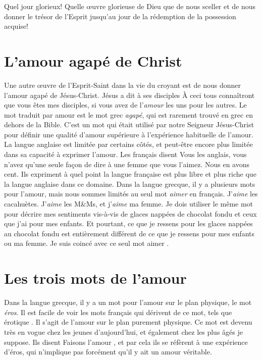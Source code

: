 Quel jour glorieux! Quelle œuvre glorieuse de Dieu que de nous sceller
 et de nous donner le trésor de l'Esprit jusqu'au jour de la rédemption
 de la possession acquise!


\section{L'amour agap\'e de Christ}

Une autre œuvre de l'Esprit-Saint dans la vie du croyant
 est de nous donner l'amour agapé de Jésus-Christ.
 Jésus a dit à ses disciples\frcolon{}
 \Og À ceci tous connaîtront que vous êtes mes disciples,
 si vous avez de l'\emph{amour} les uns pour les autres. \Fg{}
 Le mot traduit par \Og amour \Fg{} est le mot grec \emph{agapé},
 qui est rarement trouvé en grec en dehors de la Bible.
 C'est un mot qui était utilisé par notre Seigneur Jésus-Christ
 pour définir une qualité d'amour supérieure à l'expérience habituelle
 de l'amour.
 La langue anglaise est limitée par certains côtés,
 et peut-être encore plus limitée dans sa capacité à exprimer l'amour.
 Les français disent\frcolon{}
 \Og Vous les anglais, vous n'avez qu'une seule façon de dire à une femme
 que vous l'aimez. Nous en avons cent. \Fg{}
 Ils expriment à quel point la langue française est plus libre et plus riche
 que la langue anglaise dans ce domaine.
 Dans la langue grecque, il y a plusieurs mots pour l'amour,
 mais nous sommes limités au seul mot \emph{aimer} en français.
 J'\emph{aime} les cacahuètes. J'\emph{aime} les M\&Ms,
 et j'\emph{aime} ma femme.
 Je dois utiliser le même mot pour décrire mes sentiments
 vis-à-vis de glaces nappées de chocolat fondu et ceux que j'ai
 pour mes enfants. Et pourtant, ce que je ressens pour les glaces nappées
 au chocolat fondu est entièrement différent de ce que je ressens
 pour mes enfants ou ma femme.
 Je suis coincé avec ce seul mot \Og aimer \Fg{}.


\section{Les trois mots de l'amour}

Dans la langue grecque, il y a un mot pour l'amour sur le plan physique,
 le mot \emph{éros}.
 Il est facile de voir les mots français qui dérivent de ce mot,
 tels que \Og érotique \Fg{}.
 Il s'agit de l'amour sur le plan purement physique.
 Ce mot est devenu très en vogue chez les jeunes d'aujourd'hui,
 et également chez les plus âgés je suppose. Ils disent\frcolon{}
 \Og Faisons l'amour \Fg{}, et par cela ils se réfèrent
 à une expérience  d'éros, qui n'implique pas forcément
 qu'il y ait un amour véritable.

